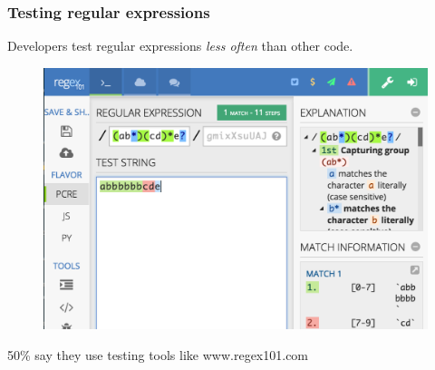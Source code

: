 %


%


\begin{frame}
\frametitle{Testing regular expressions}
Developers test regular expressions \emph{less often} than other code.
%
\begin{figure}[ht]
  \includegraphics[scale=0.35]{nontex/regex101}
  \label{fig:regex101}
\end{figure}
\begin{center}
50\% say they use testing tools like www.regex101.com
\end{center}
\end{frame}


